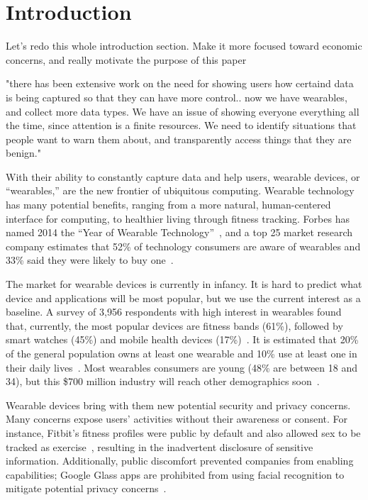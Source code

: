 \section{Introduction}

{\color {red} Let's redo this whole introduction section. Make it more focused toward economic concerns, and really motivate the purpose of this paper}

{\color {red} "there has been extensive work on the need for showing users how certaind data is being captured so that they can have more control.. now we have wearables, and collect more data types. We have an issue of showing everyone everything all the time, since attention is a finite resources. We need to identify situations that people want to warn them about, and transparently access things that they are benign."}

With their ability to constantly capture data and help users, wearable devices, or ``wearables,'' are the new frontier of ubiquitous computing. Wearable technology has many potential benefits, ranging from a more natural, human-centered interface for computing, to healthier living through fitness tracking. Forbes has named 2014 the ``Year of Wearable Technology''~\cite{Forbes}, and a top 25 market research company estimates that 52\% of technology consumers are aware of wearables and 33\% said they were likely to buy one~\cite{NPD}. 

The market for wearable devices is currently in infancy. It is hard to predict what device and applications will be most popular, but we use the current interest as a baseline. A survey of 3,956 respondents with high interest in wearables found that, currently, the most popular devices are fitness bands (61\%), followed by smart watches (45\%) and mobile health devices (17\%)~\cite{Nilsen}. It is estimated that 20\% of the general population owns at least one wearable and 10\% use at least one in their daily lives~\cite{WearableStatNews}. Most wearables consumers are young (48\% are between 18 and 34), but this \$700 million industry will reach other demographics soon~\cite{cmo}. 

Wearable devices bring with them new potential security and privacy concerns. Many concerns expose users' activities without their awareness or consent. For instance, Fitbit's fitness profiles were public by default and also allowed sex to be tracked as exercise~\cite{Fitbit}, resulting in the inadvertent disclosure of sensitive information. Additionally, public discomfort prevented companies from enabling capabilities; Google Glass apps are prohibited from using facial recognition to mitigate potential privacy concerns~\cite{GlassDetection}.

